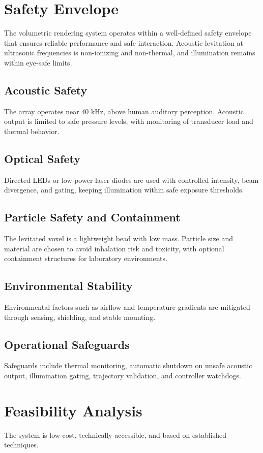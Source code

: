 \documentclass[10pt,twocolumn]{article}
\begin{document}
\section{Safety Envelope}
The volumetric rendering system operates within a well-defined safety envelope that ensures reliable performance and safe interaction. Acoustic levitation at ultrasonic frequencies is non-ionizing and non-thermal, and illumination remains within eye-safe limits.

\subsection{Acoustic Safety}
The array operates near 40 kHz, above human auditory perception. Acoustic output is limited to safe pressure levels, with monitoring of transducer load and thermal behavior.

\subsection{Optical Safety}
Directed LEDs or low-power laser diodes are used with controlled intensity, beam divergence, and gating, keeping illumination within safe exposure thresholds.

\subsection{Particle Safety and Containment}
The levitated voxel is a lightweight bead with low mass. Particle size and material are chosen to avoid inhalation risk and toxicity, with optional containment structures for laboratory environments.

\subsection{Environmental Stability}
Environmental factors such as airflow and temperature gradients are mitigated through sensing, shielding, and stable mounting.

\subsection{Operational Safeguards}
Safeguards include thermal monitoring, automatic shutdown on unsafe acoustic output, illumination gating, trajectory validation, and controller watchdogs.

\section{Feasibility Analysis}
The system is low-cost, technically accessible, and based on established techniques.
\end{document}
